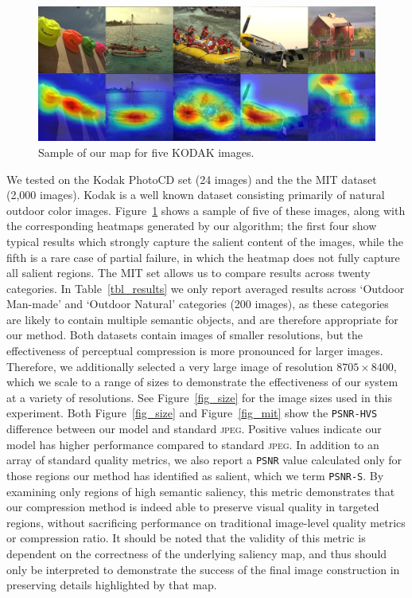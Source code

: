 \begin{figure}[H]
    \centering
    \includegraphics[scale=0.37]{figures/semantic/all_images_small.png}
    \caption[Results on KODAK]{Sample of our map for five KODAK images.\label{fig_kodak_combo}}
\end{figure}

We tested on the Kodak PhotoCD set (24 images) and the the MIT dataset (2,000 images).
Kodak is a well known dataset consisting primarily of natural outdoor color images.
Figure~\ref{fig_kodak_combo} shows a sample of five of these images, along with the corresponding heatmaps generated by our algorithm; the first four show typical results which strongly capture the salient content of the images, while the fifth is a rare case of partial failure, in which the heatmap does not fully capture all salient regions.
The MIT set allows us to compare results across twenty categories. In Table~\ref{tbl_results} we only report averaged results across `Outdoor Man-made' and `Outdoor Natural' categories (200 images), as these categories are likely to contain multiple semantic objects, and are therefore appropriate for our method.
Both datasets contain images of smaller resolutions, but the effectiveness of perceptual compression is more pronounced for larger images.
Therefore, we additionally selected a very large image of resolution $8705\times8400$, which we scale to a range of sizes to demonstrate the effectiveness of our system at a variety of resolutions.
See Figure~\ref{fig_size} for the image sizes used in this experiment.
Both Figure~\ref{fig_size} and Figure~\ref{fig_mit} show the \texttt{PSNR-HVS} difference between our model and standard \textsc{jpeg}. Positive values indicate our model has higher performance compared to standard \textsc{jpeg}.
In addition to an array of standard quality metrics, we also report a \texttt{PSNR} value calculated only for those regions our method has identified as salient, which we term \texttt{PSNR-S}.
By examining only regions of high semantic saliency, this metric demonstrates that our compression method is indeed able to preserve visual quality in targeted regions, without sacrificing performance on traditional image-level quality metrics or compression ratio.
It should be noted that the validity of this metric is dependent on the correctness of the underlying saliency map, and thus should only be interpreted to demonstrate the success of the final image construction in preserving details highlighted by that map.

